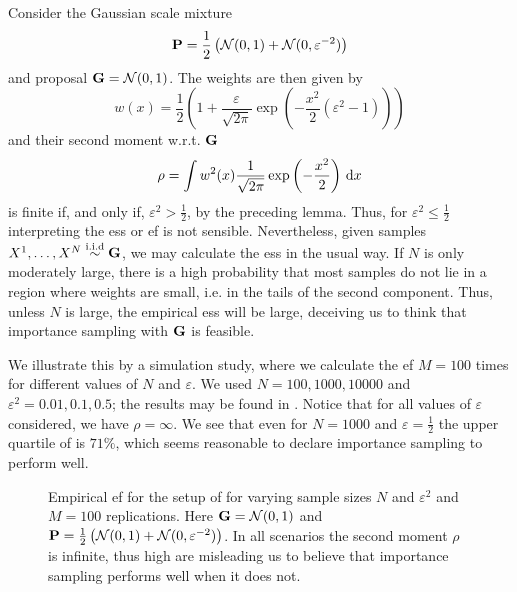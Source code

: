 \begin{example}
    \label{ex:ess_failure}
    Consider the Gaussian scale mixture
    $$
    \P = \frac{1}{2} \left(\mathcal N (0,1) + \mathcal N(0, \varepsilon^{-2})\right)
    $$
    and proposal $\G = \mathcal N(0, 1)$. The weights are then given by 
    $$
        w(x) = \frac{1}{2} \left( 1 + \frac{\varepsilon}{\sqrt{2\pi}} \exp \left( - \frac{x^{2}}{2} \left( \varepsilon^{2} - 1\right) \right)\right)
    $$ and their second moment w.r.t. $\G$ 
    $$
    \rho = \int w^{2}(x) \frac{1}{\sqrt{2\pi}} \exp \left( -\frac{x^{2}}{2} \right) \d x
    $$
    is finite if, and only if, $\varepsilon^{2} > \frac{1}{2}$, by the preceding lemma. Thus, for $\varepsilon^{2} \leq \frac{1}{2}$ interpreting the \acrshort{ess} or \acrshort{ef} is not sensible. Nevertheless, given samples $X^{1}, \dots, X^{N} \iid \G$, we may calculate the \acrshort{ess} in the usual way. If $N$ is only moderately large, there is a high probability that most samples do not lie in a region where weights are small, i.e. in the tails of the second component. Thus, unless $N$ is large, the empirical \acrshort{ess} will be large, deceiving us to think that importance sampling with $\G$ is feasible.

    We illustrate this by a simulation study, where we calculate the \acrshort{ef} $M=100$ times for different values of $N$ and $\varepsilon$. We used $N = 100, 1000, 10000$ and $\varepsilon^{2} = 0.01, 0.1, 0.5$; the results may be found in . Notice that for all values of $\varepsilon$ considered, we have $\rho = \infty$. We see that even for $N = 1000$ and $\varepsilon = \frac{1}{2}$ the upper quartile of  is $71\%$, which seems reasonable to declare importance sampling to perform well. 

    \begin{figure}
        \centering

        \resizebox{\textwidth}{!}{%
        }
        \caption{Empirical \acrshort{ef} for the setup of  for varying sample sizes $N$ and $\varepsilon^{2}$ and $M=100$ replications. Here $\G = \mathcal N(0,1)$ and $\P = \frac{1}{2} \left( \mathcal N (0,1) + \mathcal N(0, \varepsilon^{-2}) \right)$. In all scenarios the second moment $\rho$ is infinite, thus high  are misleading us to believe that importance sampling performs well when it does not.}
        \label{fig:ess_failure}
    \end{figure}

\end{example}

